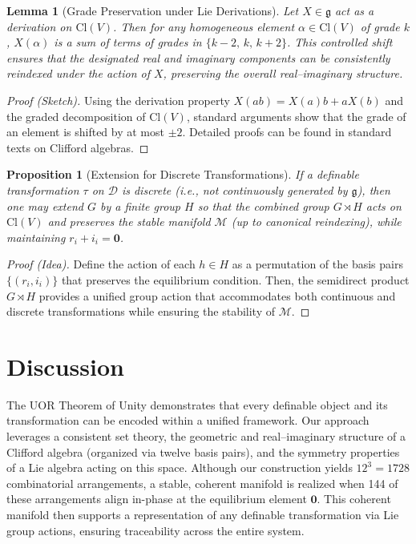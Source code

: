 \documentclass{article}
\newtheorem{lemma}{Lemma}[section]
\newtheorem{proposition}{Proposition}[section]
\begin{document}
\begin{lemma}[Grade Preservation under Lie Derivations]
\label{lem:grade}
Let $X \in \mathfrak{g}$ act as a derivation on $\mathrm{Cl}(V)$. Then for any homogeneous element $\alpha \in \mathrm{Cl}(V)$ of grade $k$, $X(\alpha)$ is a sum of terms of grades in $\{k-2,\, k,\, k+2\}$. This controlled shift ensures that the designated real and imaginary components can be consistently reindexed under the action of $X$, preserving the overall real--imaginary structure.
\end{lemma}

\begin{proof}[Proof (Sketch)]
Using the derivation property $X(ab)=X(a)b+aX(b)$ and the graded decomposition of $\mathrm{Cl}(V)$, standard arguments show that the grade of an element is shifted by at most $\pm 2$. Detailed proofs can be found in standard texts on Clifford algebras.
\end{proof}

\begin{proposition}[Extension for Discrete Transformations]
\label{prop:discrete}
If a definable transformation $\tau$ on $\mathcal{D}$ is discrete (i.e., not continuously generated by $\mathfrak{g}$), then one may extend $G$ by a finite group $H$ so that the combined group $G \rtimes H$ acts on $\mathrm{Cl}(V)$ and preserves the stable manifold $\mathcal{M}$ (up to canonical reindexing), while maintaining $r_i + i_i = \mathbf{0}$.
\end{proposition}

\begin{proof}[Proof (Idea)]
Define the action of each $h\in H$ as a permutation of the basis pairs $\{(r_i,i_i)\}$ that preserves the equilibrium condition. Then, the semidirect product $G \rtimes H$ provides a unified group action that accommodates both continuous and discrete transformations while ensuring the stability of $\mathcal{M}$.
\end{proof}

\section{Discussion}

The UOR Theorem of Unity demonstrates that every definable object and its transformation can be encoded within a unified framework. Our approach leverages a consistent set theory, the geometric and real--imaginary structure of a Clifford algebra (organized via twelve basis pairs), and the symmetry properties of a Lie algebra acting on this space. Although our construction yields $12^3 = 1728$ combinatorial arrangements, a stable, coherent manifold is realized when 144 of these arrangements align in-phase at the equilibrium element $\mathbf{0}$. This coherent manifold then supports a representation of any definable transformation via Lie group actions, ensuring traceability across the entire system.
\end{document}
